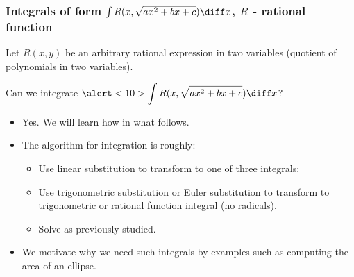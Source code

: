 \begin{frame}
\frametitle{Integrals of form $\int R(x,\sqrt{ax^2+bx+c}) \diff x$, $R$ - rational function}
Let $R(x,y)$ be an arbitrary rational expression in two variables (quotient of polynomials in two variables).
\begin{question}
Can we integrate $\alert<10>{\displaystyle\int R(x,\sqrt{ax^2+bx+c})\diff x}$?
\end{question}
\begin{itemize}
\item<2-> Yes. We will learn how in what follows.
\item<3-> The algorithm for integration is roughly:
\begin{itemize}
\item<4-> Use linear substitution to transform to one of three integrals: 
  
\item<8-> Use trigonometric substitution or Euler substitution to transform to trigonometric or rational function integral (no radicals).
\item<9-> Solve as previously studied.
\end{itemize}
\item<10-> We motivate why we need \alert<10>{such integrals } by examples such as computing the area of an ellipse.
\end{itemize}
\end{frame}
